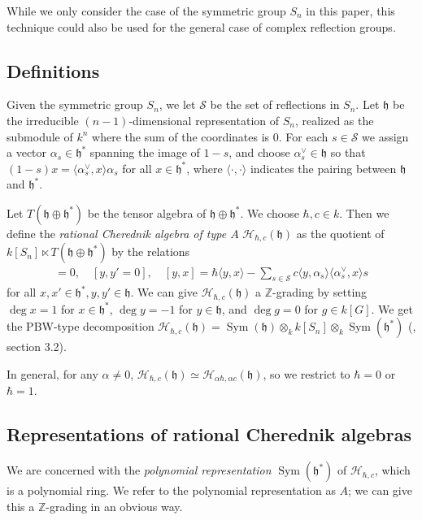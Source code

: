 \documentclass{amsart}
\numberwithin{equation}{section}
\theoremstyle{definition}
\newcommand{\h}{\mathfrak{h}}
\newcommand{\HH}{\mathcal{H}}
\newcommand{\Sym}{\operatorname{Sym}}
\begin{document}
While we only consider the case of the symmetric group $S_n$ in this paper, this technique could also be used for the general case of complex reflection groups. %


\subsection{Definitions}

Given the symmetric group $S_n$, we let $\mathcal{S}$ be the set of reflections in $S_n$. Let $\h$ be the irreducible $(n-1)$-dimensional representation of $S_n$, realized as the submodule of $k^n$ where the sum of the coordinates is $0$. For each $s \in \mathcal{S}$ we assign a vector $\alpha_s \in \h^*$ spanning the image of $1-s$, and choose $\alpha_s^\vee \in \h$ so that $(1-s)x=\langle \alpha_s^\vee,x\rangle \alpha_s$ for all $x \in \h^*$, where $\langle \cdot,\cdot\rangle$ indicates the pairing between $\h$ and $\h^*$. 

Let $T(\h \oplus \h^*)$ be the tensor algebra of $\h \oplus \h^*$. We choose $\hbar,c \in k$. Then we define the {\it rational Cherednik algebra of type $A$} $\HH_{\hbar,c}(\h)$ as the quotient of $k[S_n] \ltimes T(\h \oplus \h^*)$ by the relations
\begin{align*}
[x,x']=0, \quad [y,y' = 0], \quad [y,x] = \hbar\langle y,x\rangle - \sum_{s \in \mathcal{S}} c\langle y,\alpha_s\rangle\langle \alpha_s^\vee,x\rangle s
\end{align*}
 for all $x,x' \in \h^*, y,y' \in \h$. We can give $\HH_{\hbar,c}(\h)$ a $\mathbb{Z}$-grading by setting $\deg x=1$ for $x \in \h^*$, $\deg y = -1$ for $y \in \h$, and $\deg g=0$ for $g \in k[G]$. We get the PBW-type decomposition $\HH_{\hbar,c}(\h)=\Sym(\h) \otimes_k k[S_n] \otimes_k \Sym(\h^*)$ (\cite{EM}, section 3.2). 

In general, for any $\alpha \ne 0$, $\HH_{\hbar,c}(\h)\simeq \HH_{\alpha\hbar,\alpha c}(\h)$, so we restrict to $\hbar=0$ or $\hbar = 1$. 

\subsection{Representations of rational Cherednik algebras}

We are concerned with the {\it polynomial representation} $\Sym(\h^*)$ of $\HH_{\hbar,c}$, which is a polynomial ring. We refer to the polynomial representation as $A$; we can give this a $\mathbb{Z}$-grading in an obvious way. 
\end{document}
